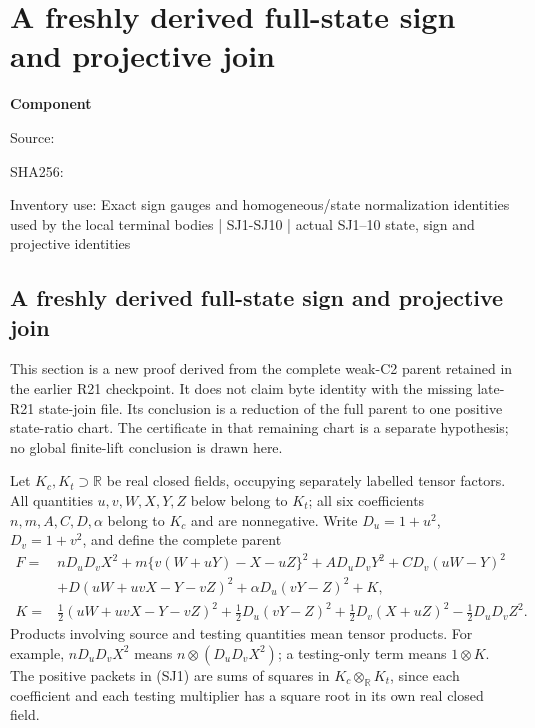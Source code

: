 \chapter{A freshly derived full-state sign and projective join}
\label{component:pf77de02d80c4}
\noindent\textbf{Component }\par
{\small\noindent Source: \par}
{\small\noindent SHA256: \par}
{\small\noindent Inventory use: Exact sign gauges and homogeneous/state normalization identities used by the local terminal bodies | SJ1-SJ10 | actual SJ1--10 state, sign and projective identities\par}
\medskip
\section{A freshly derived full-state sign and projective join}
\label{pf77de02d80c4:sec:rederived-state-join}

This section is a new proof derived from the complete weak-C2 parent retained
in the earlier R21 checkpoint.  It does not claim byte identity with the
missing late-R21 state-join file.  Its conclusion is a reduction of the full
parent to one positive state-ratio chart.  The certificate in that remaining
chart is a separate hypothesis; no global finite-lift conclusion is drawn
here.

Let $K_c,K_t\supset\mathbb R$ be real closed fields, occupying separately
labelled tensor factors.  All quantities $u,v,W,X,Y,Z$ below belong to $K_t$;
all six coefficients $n,m,A,C,D,\alpha$ belong to $K_c$ and are nonnegative.
Write $D_u=1+u^2$, $D_v=1+v^2$, and define the complete parent
\begin{align}
 F={}&nD_uD_vX^2+m\{v(W+uY)-X-uZ\}^2
       +AD_uD_vY^2+CD_v(uW-Y)^2\\
    &+D(uW+uvX-Y-vZ)^2+\alpha D_u(vY-Z)^2+K,\tag{SJ1}\\
 K={}&\tfrac12(uW+uvX-Y-vZ)^2
       +\tfrac12D_u(vY-Z)^2
       +\tfrac12D_v(X+uZ)^2-\tfrac12D_uD_vZ^2.\tag{SJ2}
\end{align}
Products involving source and testing quantities mean tensor products.
For example, $nD_uD_vX^2$ means
$n\otimes(D_uD_vX^2)$; a testing-only term means $1\otimes K$.
The positive packets in (SJ1) are sums of squares in
$K_c\otimes_{\mathbb R}K_t$, since each coefficient and each testing
multiplier has a square root in its own real closed field.

